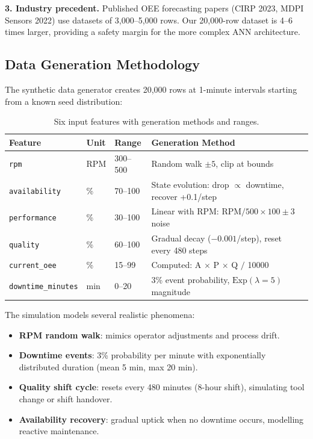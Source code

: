 \documentclass[a4paper,11pt]{article}
\begin{document}
\textbf{3. Industry precedent.} Published OEE forecasting papers (CIRP 2023, MDPI Sensors 2022) use datasets of 3,000--5,000 rows. Our 20,000-row dataset is 4--6 times larger, providing a safety margin for the more complex ANN architecture.

\subsection{Data Generation Methodology}

The synthetic data generator creates 20,000 rows at 1-minute intervals starting from a known seed distribution:

\begin{table}[h]
\centering
\begin{tabular}{@{}llll@{}}
\toprule
\textbf{Feature} & \textbf{Unit} & \textbf{Range} & \textbf{Generation Method} \\
\midrule
\texttt{rpm} & RPM & 300--500 & Random walk $\pm 5$, clip at bounds \\
\texttt{availability} & \% & 70--100 & State evolution: drop $\propto$ downtime, recover +0.1/step \\
\texttt{performance} & \% & 30--100 & Linear with RPM: $\text{RPM}/500 \times 100 \pm 3$ noise \\
\texttt{quality} & \% & 60--100 & Gradual decay ($-0.001$/step), reset every 480 steps \\
\texttt{current\_oee} & \% & 15--99 & Computed: A $\times$ P $\times$ Q $/$ 10000 \\
\texttt{downtime\_minutes} & min & 0--20 & 3\% event probability, $\text{Exp}(\lambda=5)$ magnitude \\
\bottomrule
\end{tabular}
\caption{Six input features with generation methods and ranges.}
\end{table}

The simulation models several realistic phenomena:
\begin{itemize}
    \item \textbf{RPM random walk}: mimics operator adjustments and process drift.
    \item \textbf{Downtime events}: 3\% probability per minute with exponentially distributed duration (mean 5 min, max 20 min).
    \item \textbf{Quality shift cycle}: resets every 480 minutes (8-hour shift), simulating tool change or shift handover.
    \item \textbf{Availability recovery}: gradual uptick when no downtime occurs, modelling reactive maintenance.
\end{itemize}
\end{document}

